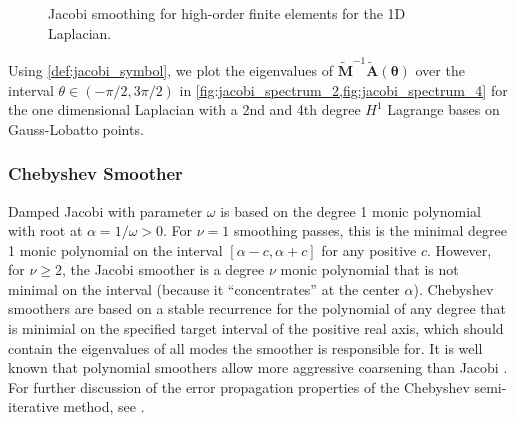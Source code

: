 \documentclass[review]{siamart190516}
\begin{document}
\begin{figure}[!tbp]
  \centering
  \hfill
  \caption{Jacobi smoothing for high-order finite elements for the 1D Laplacian.}
\end{figure}

Using \cref{def:jacobi_symbol}, we plot the eigenvalues of $\tilde{\mathbf{M}}^{-1} \tilde{\mathbf{A}} \left( \boldsymbol{\theta} \right)$ over the interval $\theta \in \left( - \pi / 2, 3 \pi / 2 \right)$ in \cref{fig:jacobi_spectrum_2,fig:jacobi_spectrum_4} for the one dimensional Laplacian with a 2nd and 4th degree $H^1$ Lagrange bases on Gauss-Lobatto points.

\subsubsection{Chebyshev Smoother}\label{sec:chebyshev}

Damped Jacobi with parameter $\omega$ is based on the degree 1 monic polynomial with root at $\alpha = 1/\omega > 0$.
For $\nu=1$ smoothing passes, this is the minimal degree 1 monic polynomial on the interval $[\alpha-c, \alpha+c]$ for any positive $c$.
However, for $\nu \ge 2$, the Jacobi smoother is a degree $\nu$ monic polynomial that is not minimal on the interval (because it ``concentrates'' at the center $\alpha$).
Chebyshev smoothers are based on a stable recurrence for the polynomial of any degree that is minimial on the specified target interval of the positive real axis, which should contain the eigenvalues of all modes the smoother is responsible for.
It is well known that polynomial smoothers allow more aggressive coarsening than Jacobi \cite{brannick2015polynomial}.
For further discussion of the error propagation properties of the Chebyshev semi-iterative method, see \cite{gutknecht2002revisited}.
\end{document}
